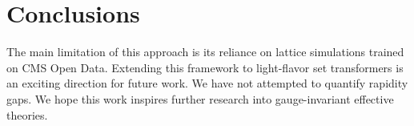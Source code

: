 \section{Conclusions}\label{sec:conclusions}

The main limitation of this approach is its reliance on lattice
simulations trained on CMS Open Data. Extending this framework to
light-flavor set transformers is an exciting direction for future work.
We have not attempted to quantify rapidity gaps. We hope this work
inspires further research into gauge-invariant effective theories.

